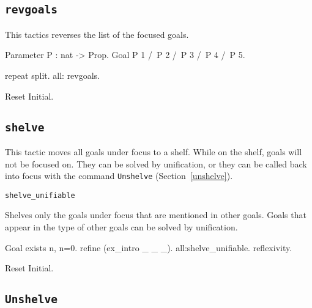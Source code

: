 \begin{coq_example*}
\subsection[\tt revgoals]{\tt revgoals}

This tactics reverses the list of the focused goals.

\Example
\begin{coq_example*}
Parameter P : nat -> Prop.
Goal P 1 /\ P 2 /\ P 3 /\ P 4 /\ P 5.
\end{coq_example*}
\begin{coq_example}
repeat split.
all: revgoals.
\end{coq_example}

\begin{coq_eval}
Reset Initial.
\end{coq_eval}



\subsection[\tt shelve]{\tt shelve\label{shelve}}

This tactic moves all goals under focus to a shelf. While on the shelf, goals
will not be focused on. They can be solved by unification, or they can be called
back into focus with the command {\tt Unshelve} (Section~\ref{unshelve}).

\begin{Variants}
  \item \texttt{shelve\_unifiable}

    Shelves only the goals under focus that are mentioned in other goals.
    Goals that appear in the type of other goals can be solved by unification.

\Example
\begin{coq_example}
Goal exists n, n=0.
refine (ex_intro _ _ _).
all:shelve_unifiable.
reflexivity.
\end{coq_example}

\begin{coq_eval}
Reset Initial.
\end{coq_eval}

\end{Variants}

\subsection[\tt Unshelve]{\tt Unshelve\label{unshelve}}


\end{coq_example*}
